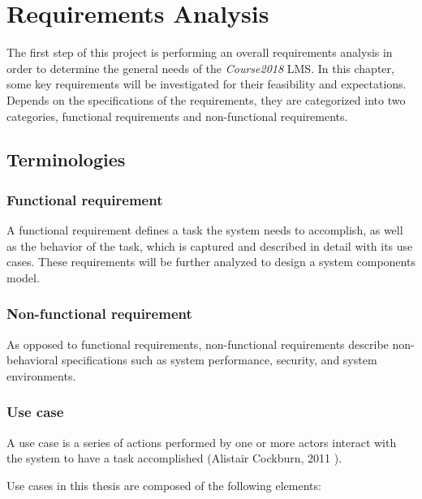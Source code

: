 

\chapter{Requirements Analysis}
\label{chap:REQS}

The first step of this project is performing an overall requirements analysis
in order to determine the general needs of the \emph{Course2018} LMS.
In this chapter, some key requirements will be investigated for their
feasibility and expectations.
Depends on the specifications of the requirements, they are categorized into
two categories, functional requirements and non-functional requirements.

\section{Terminologies}

\subsection{Functional requirement}
A functional requirement defines a task the system needs to accomplish,
as well as the behavior of the task, which is captured and described in detail
with its use cases.
These requirements will be further analyzed to design a system components
model.~\cite{functionalReqs}

\subsection{Non-functional requirement}
As opposed to functional requirements, non-functional requirements describe
non-behavioral specifications such as system performance, security, and system
environments.

\subsection{Use case}
A use case is a series of actions performed by one or more actors interact
with the system to have a task accomplished
(Alistair Cockburn, 2011 \cite{useCase}).

\medskip 

Use cases in this thesis are composed of the following elements:

